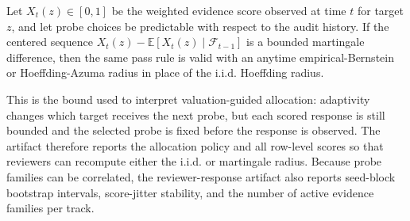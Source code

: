 \begin{proposition}
Let $X_t(z)\in[0,1]$ be the weighted evidence score observed at time $t$ for target $z$, and let probe choices be predictable with respect to the audit history. If the centered sequence $X_t(z)-\mathbb{E}[X_t(z)\mid \mathcal{F}_{t-1}]$ is a bounded martingale difference, then the same pass rule is valid with an anytime empirical-Bernstein or Hoeffding-Azuma radius in place of the i.i.d. Hoeffding radius.
\end{proposition}

This is the bound used to interpret valuation-guided allocation: adaptivity changes which target receives the next probe, but each scored response is still bounded and the selected probe is fixed before the response is observed. The artifact therefore reports the allocation policy and all row-level scores so that reviewers can recompute either the i.i.d. or martingale radius. Because probe families can be correlated, the reviewer-response artifact also reports seed-block bootstrap intervals, score-jitter stability, and the number of active evidence families per track.
